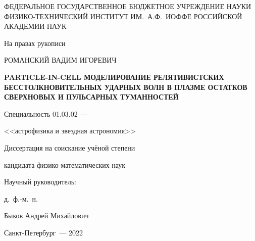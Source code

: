 \thispagestyle{empty}

\begin{center}
{\small
ФЕДЕРАЛЬНОЕ ГОСУДАРСТВЕННОЕ БЮДЖЕТНОЕ УЧРЕЖДЕНИЕ НАУКИ\\
ФИЗИКО-ТЕХНИЧЕСКИЙ ИНСТИТУТ ИМ.~А.Ф.~ИОФФЕ РОССИЙСКОЙ АКАДЕМИИ НАУК\\
}
\end{center}

\vspace{10mm}
\begin{flushright}
На правах рукописи

\end{flushright}

\vspace{20mm}
\begin{center}
{\large РОМАНСКИЙ ВАДИМ ИГОРЕВИЧ}
\end{center}

\vspace{5mm}
\begin{center}
{\bf \large PARTICLE-IN-CELL МОДЕЛИРОВАНИЕ
	РЕЛЯТИВИСТСКИХ БЕССТОЛКНОВИТЕЛЬНЫХ УДАРНЫХ ВОЛН В
	ПЛАЗМЕ ОСТАТКОВ СВЕРХНОВЫХ И ПУЛЬСАРНЫХ ТУМАННОСТЕЙ
\par}

\vspace{10mm}
{%
Специальность 01.03.02~---

<<астрофизика и звездная астрономия>>
}

\vspace{10mm}
Диссертация на соискание учёной степени

кандидата физико-математических наук
\end{center}

\vspace{10mm}
\begin{flushright}
Научный руководитель:

д.~ф.-м.~н.

Быков Андрей Михайлович
\end{flushright}

\vspace{20mm}
\begin{center}
{Санкт-Петербург~--- 2022}
\end{center}

\newpage